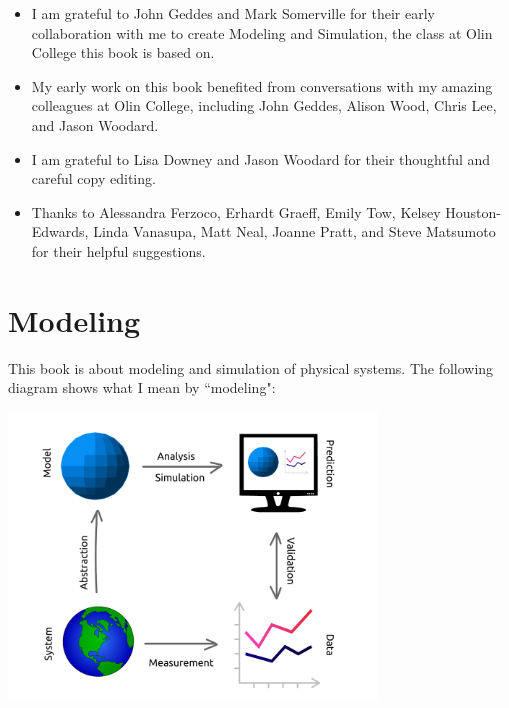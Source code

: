 \documentclass[12pt]{book}
\theoremstyle{exercise}
\begin{document}
\begin{itemize}

\item I am grateful to John Geddes and Mark Somerville for their early collaboration with me to create Modeling and Simulation, the class at Olin College this book is based on.

\item My early work on this book benefited from conversations with
my amazing colleagues at Olin College, including John Geddes, Alison
Wood, Chris Lee, and Jason Woodard.

\item I am grateful to Lisa Downey and Jason Woodard for their thoughtful and careful copy editing.

\item Thanks to Alessandra Ferzoco, Erhardt Graeff, Emily Tow,
Kelsey Houston-Edwards, Linda Vanasupa, Matt Neal, Joanne Pratt, and Steve Matsumoto for their helpful suggestions.


\end{itemize}



\normalsize

\cleardoublepage

\begin{latexonly}


\cleardoublepage

\end{latexonly}

\mainmatter


\chapter{Modeling}
\label{chap01}

This book is about modeling and simulation of physical systems.  
The following diagram shows what I mean by ``modeling":


\vspace{0.2in}
\centerline{\includegraphics[height=3in]{figs/modeling_framework.pdf}}
\end{document}
